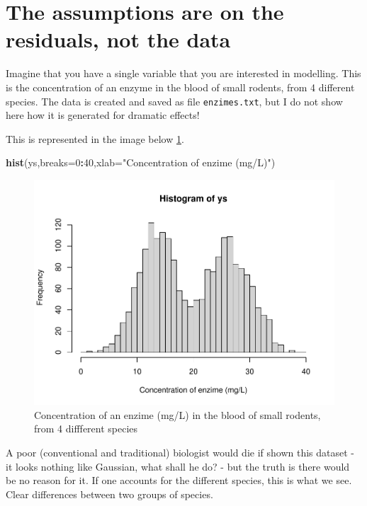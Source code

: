 \documentclass[
]{book}
\newenvironment{Shaded}{\begin{snugshade}}{\end{snugshade}}
\newcommand{\AttributeTok}[1]{\textcolor[rgb]{0.13,0.29,0.53}{#1}}
\newcommand{\DecValTok}[1]{\textcolor[rgb]{0.00,0.00,0.81}{#1}}
\newcommand{\FunctionTok}[1]{\textcolor[rgb]{0.13,0.29,0.53}{\textbf{#1}}}
\newcommand{\NormalTok}[1]{#1}
\newcommand{\SpecialCharTok}[1]{\textcolor[rgb]{0.81,0.36,0.00}{\textbf{#1}}}
\newcommand{\StringTok}[1]{\textcolor[rgb]{0.31,0.60,0.02}{#1}}
\begin{document}
\hypertarget{the-assumptions-are-on-the-residuals-not-the-data}{%
\section{The assumptions are on the residuals, not the data}\label{the-assumptions-are-on-the-residuals-not-the-data}}

Imagine that you have a single variable that you are interested in modelling. This is the concentration of an enzyme in the blood of small rodents, from 4 different species. The data is created and saved as file \texttt{enzimes.txt}, but I do not show here how it is generated for dramatic effects!

This is represented in the image below \ref{fig:figrodents}.

\begin{Shaded}
\begin{Highlighting}[]
\FunctionTok{hist}\NormalTok{(ys,}\AttributeTok{breaks=}\DecValTok{0}\SpecialCharTok{:}\DecValTok{40}\NormalTok{,}\AttributeTok{xlab=}\StringTok{"Concentration of enzime (mg/L)"}\NormalTok{)}
\end{Highlighting}
\end{Shaded}

\begin{figure}

{\centering \includegraphics[width=0.8\linewidth]{ECOMODbook_files/figure-latex/figrodents-1} 

}

\caption{Concentration of an enzime (mg/L) in the blood of small rodents, from 4 diffferent species}\label{fig:figrodents}
\end{figure}

A poor (conventional and traditional) biologist would die if shown this dataset - it looks nothing like Gaussian, what shall he do? - but the truth is there would be no reason for it. If one accounts for the different species, this is what we see. Clear differences between two groups of species.
\end{document}
